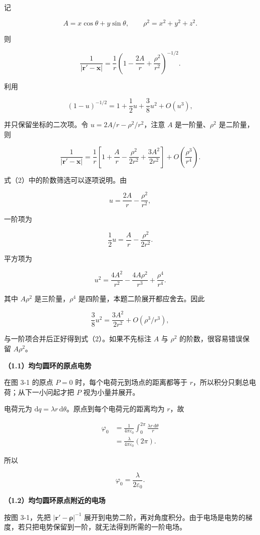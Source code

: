 \documentclass[12pt,a4paper,UTF8]{ctexart}
\begin{document}
记

\[A=x\cos\theta+y\sin\theta,\qquad
\rho^2=x^2+y^2+z^2.\]

则

\[\frac1{|\boldsymbol r'-\boldsymbol x|}
=\frac1r\left(1-\frac{2A}{r}+\frac{\rho^2}{r^2}\right)^{-1/2}. \tag{1}\]

利用

\[ (1-u)^{-1/2}=1+\frac12u+\frac38u^2+O(u^3),\]

并只保留坐标的二次项。令 \(u=2A/r-\rho^2/r^2\)，注意 \(A\)
是一阶量、\(\rho^2\) 是二阶量，则

\[\boxed{
\frac1{|\boldsymbol r'-\boldsymbol x|}
=\frac1r\left[1+\frac{A}{r}
-\frac{\rho^2}{2r^2}
+\frac{3A^2}{2r^2}
\right]+O\!\left(\frac{\rho^3}{r^4}\right)
}. \tag{2}\]

式（2）中的阶数筛选可以逐项说明。由

\[u=\frac{2A}{r}-\frac{\rho^2}{r^2},\]

一阶项为

\[\frac12u=\frac{A}{r}-\frac{\rho^2}{2r^2}.\]

平方项为

\[u^2=\frac{4A^2}{r^2}
-\frac{4A\rho^2}{r^3}
+\frac{\rho^4}{r^4}.\]

其中 \(A\rho^2\) 是三阶量，\(\rho^4\)
是四阶量，本题二阶展开都应舍去。因此

\[\frac38u^2=\frac{3A^2}{2r^2}+O(\rho^3/r^3),\]

与一阶项合并后正好得到式（2）。如果不先标注 \(A\) 与 \(\rho^2\)
的阶数，很容易错误保留 \(A\rho^2\)。

\textbf{（1.1）均匀圆环的原点电势}

在图 3-1 的原点 \(P=0\) 时，每个电荷元到场点的距离都等于
\(r\)，所以积分只剩总电荷；从下一小问起才把 \(P\) 视为小量并展开。

电荷元为
\(\mathrm dq=\lambda r\,\mathrm d\theta\)。原点到每个电荷元的距离均为
\(r\)，故

\[\begin{aligned}
\varphi_0
&=\frac1{4\pi\varepsilon_0}
\int_0^{2\pi}\frac{\lambda r\,\mathrm d\theta}{r}\\
&=\frac{\lambda}{4\pi\varepsilon_0}(2\pi).
\end{aligned}\]

所以

\[\boxed{\varphi_0=\frac{\lambda}{2\varepsilon_0}}. \tag{3}\]

\textbf{（1.2）均匀圆环原点附近的电场}

按图 3-1，先把 \(|\boldsymbol r'-\boldsymbol\rho|^{-1}\)
展开到电势二阶，再对角度积分。由于电场是电势的梯度，若只把电势保留到一阶，就无法得到所需的一阶电场。
\end{document}
